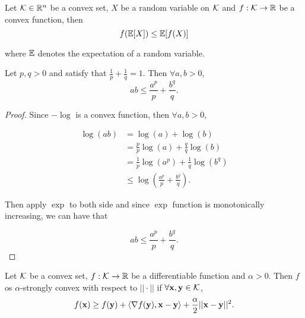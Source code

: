 \documentclass[../main.tex]{subfiles}
\begin{document}
\begin{theorem}
	Let $\mathcal{K} \in \mathbb{R}^n$ be a convex set, $X$ be a random variable on $\mathcal{K}$ and $f:\mathcal{K} \to \mathbb{R}$ be a convex function, then
	\begin{equation}
		f(\mathbb{E}[X]) \leq \mathbb{E}[f(X)]
	\end{equation}
	
	where $\mathbb{E}$ denotes the expectation of a random variable.
\end{theorem}

\begin{theorem}
	Let $p, q > 0$ and satisfy that $\frac{1}{p} + \frac{1}{q} = 1$. Then $\forall a, b > 0$,
	\begin{equation}
		ab \leq \frac{a^p}{p} + \frac{b^q}{q}.
	\end{equation}
\end{theorem}

\begin{proof}
	Since $-\log$ is a convex function, then $\forall a, b > 0$,
	
	\begin{equation*}
		\begin{aligned}
			\log(ab) & =\log(a) + \log(b) \\
					 & = \frac{p}{p} \log (a) + \frac{q}{q}\log (b)\\
					 & = \frac{1}{p} \log(a^p) + \frac{1}{q} \log(b^q) \\
					 & \leq \log (\frac{a^p}{p} + \frac{b^q}{q} ).
		\end{aligned}
	\end{equation*}
	
	Then apply $\exp$ to both side and since $\exp$ function is monotonically increasing, we can have that 
	
	\begin{equation*}
	ab \leq \frac{a^p}{p} + \frac{b^q}{q}.
	\end{equation*}
\end{proof}


\begin{definition}
	Let $\mathcal{K}$ be a convex set, $f: \mathcal{K} \to \mathbb{R}$ be a differentiable function and $\alpha > 0$. Then $f$ os $\alpha$-strongly convex with respect to $||\cdot||$ if $\forall \mathbf{x}, \mathbf{y} \in \mathcal{K}$, 
	\begin{equation}
		f(\mathbf{x}) \geq f(\mathbf{y}) + \langle \nabla f(\mathbf{y}), \mathbf{x} - \mathbf{y} \rangle + \frac{\alpha}{2} ||\mathbf{x} - \mathbf{y}||^2.
	\end{equation}
\end{definition}
\end{document}
